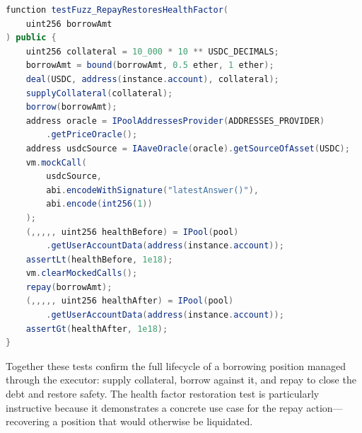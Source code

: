 \begin{enumerate}
\begin{lstlisting}[language=Java,caption={Repay health factor restoration test},label=lst:test-repay-health]
function testFuzz_RepayRestoresHealthFactor(
    uint256 borrowAmt
) public {
    uint256 collateral = 10_000 * 10 ** USDC_DECIMALS;
    borrowAmt = bound(borrowAmt, 0.5 ether, 1 ether);
    deal(USDC, address(instance.account), collateral);
    supplyCollateral(collateral);
    borrow(borrowAmt);
    address oracle = IPoolAddressesProvider(ADDRESSES_PROVIDER)
        .getPriceOracle();
    address usdcSource = IAaveOracle(oracle).getSourceOfAsset(USDC);
    vm.mockCall(
        usdcSource,
        abi.encodeWithSignature("latestAnswer()"),
        abi.encode(int256(1))
    );
    (,,,,, uint256 healthBefore) = IPool(pool)
        .getUserAccountData(address(instance.account));
    assertLt(healthBefore, 1e18);
    vm.clearMockedCalls();
    repay(borrowAmt);
    (,,,,, uint256 healthAfter) = IPool(pool)
        .getUserAccountData(address(instance.account));
    assertGt(healthAfter, 1e18);
}
\end{lstlisting}
\end{enumerate}

Together these tests confirm the full lifecycle of a borrowing position managed through the executor: supply collateral, borrow against it, and repay to close the debt and restore safety. The health factor restoration test is particularly instructive because it demonstrates a concrete use case for the repay action---recovering a position that would otherwise be liquidated.
